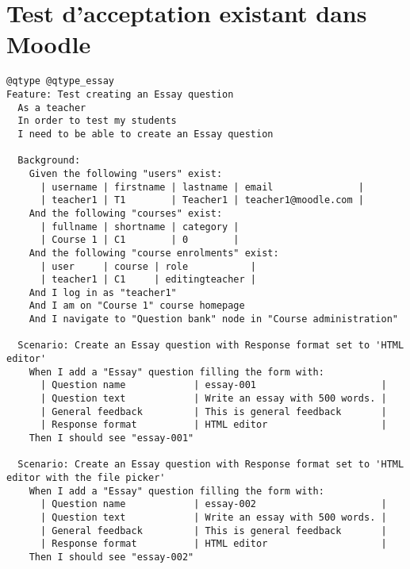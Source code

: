 \appendix
\chapter{Test d'acceptation existant dans Moodle}
\label{annexe_behat_exist}

\begin{lstlisting}[frame=l]
@qtype @qtype_essay
Feature: Test creating an Essay question
  As a teacher
  In order to test my students
  I need to be able to create an Essay question

  Background:
    Given the following "users" exist:
      | username | firstname | lastname | email               |
      | teacher1 | T1        | Teacher1 | teacher1@moodle.com |
    And the following "courses" exist:
      | fullname | shortname | category |
      | Course 1 | C1        | 0        |
    And the following "course enrolments" exist:
      | user     | course | role           |
      | teacher1 | C1     | editingteacher |
    And I log in as "teacher1"
    And I am on "Course 1" course homepage
    And I navigate to "Question bank" node in "Course administration"

  Scenario: Create an Essay question with Response format set to 'HTML editor'
    When I add a "Essay" question filling the form with:
      | Question name            | essay-001                      |
      | Question text            | Write an essay with 500 words. |
      | General feedback         | This is general feedback       |
      | Response format          | HTML editor                    |
    Then I should see "essay-001"

  Scenario: Create an Essay question with Response format set to 'HTML editor with the file picker'
    When I add a "Essay" question filling the form with:
      | Question name            | essay-002                      |
      | Question text            | Write an essay with 500 words. |
      | General feedback         | This is general feedback       |
      | Response format          | HTML editor                    |
    Then I should see "essay-002"
\end{lstlisting}